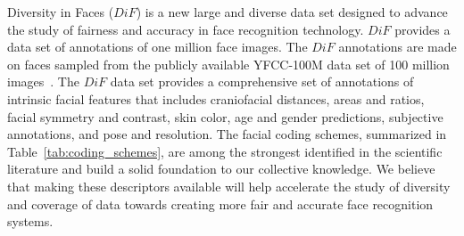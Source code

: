 \documentclass[letterpaper,11pt]{article}
\begin{document}
Diversity in Faces ($DiF$) is a new large and diverse data set designed to advance the study of fairness and accuracy in face recognition technology.  $DiF$ provides a data set of annotations of one million face images.  The $DiF$ annotations are made on faces sampled from the publicly available YFCC-100M data set of 100 million images~\cite{yahoo100m_CACM16}.  The $DiF$ data set provides a comprehensive set of annotations of intrinsic facial features that includes craniofacial distances, areas and ratios, facial symmetry and contrast, skin color, age and gender predictions, subjective annotations, and pose and resolution.  The facial coding schemes, summarized in Table~\ref{tab:coding_schemes}, are among the strongest identified in the scientific literature and build a solid foundation to our collective knowledge.  We believe that making these descriptors available will help accelerate the study of diversity and coverage of data towards creating more fair and accurate face recognition systems. 
\end{document}
